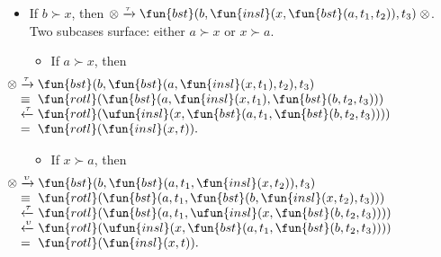 \begin{itemize}

  \item If \(b \succ x\), then \(\otimes \xrightarrow{\smash{\tau}}
  \fun{bst}(b,\fun{insl}(x,\fun{bst}(a,t_1,t_2)),t_3) \; \otimes\).
  Two subcases surface: either \(a \succ x\) or \(x \succ a\).

  \begin{itemize}
    \item If \(a \succ x\), then
      \begin{equation*}
        \hspace*{-32mm}
        \begin{array}{@{}r@{\;}l@{\;}l@{}}
          \otimes &
          \xrightarrow{\smash{\tau}} &
          \fun{bst}(b,\fun{bst}(a,\fun{insl}(x,t_1),t_2),t_3)\\
          & \equiv &
          \fun{rotl}(\fun{bst}(a,\fun{insl}(x,t_1),
          \fun{bst}(b,t_2,t_3)))\\
          & \xleftarrow{\smash{\tau}} &
          \fun{rotl}(\ufun{insl}(x,\fun{bst}(a,t_1,
          \fun{bst}(b,t_2,t_3))))\\
          & = & \fun{rotl}(\fun{insl}(x,t)).
        \end{array}
      \end{equation*}

    \item If \(x \succ a\), then
      \begin{equation*}
        \hspace*{-32mm}
        \begin{array}{@{}r@{\;}l@{\;}l@{}}
          \otimes &
          \xrightarrow{\smash{\upsilon}} &
          \fun{bst}(b,\fun{bst}(a,t_1,\fun{insl}(x,t_2)),t_3)\\
          & \equiv &
          \fun{rotl}(\fun{bst}(a,t_1,\fun{bst}(b,\fun{insl}(x,t_2),t_3)))\\
          & \xleftarrow{\smash{\tau}} &
          \fun{rotl}(\fun{bst}(a,t_1,\ufun{insl}(x,\fun{bst}(b,t_2,t_3))))\\
          & \xleftarrow{\smash{\upsilon}} &
          \fun{rotl}(\ufun{insl}(x,\fun{bst}(a,t_1,\fun{bst}(b,t_2,t_3))))\\
          & = & \fun{rotl}(\fun{insl}(x,t)).
        \end{array}
      \end{equation*}
  \end{itemize}


\end{itemize}
